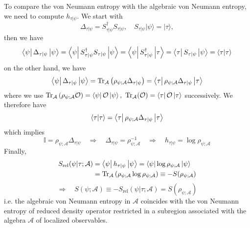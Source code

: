 \documentclass[a4paper,11pt]{article}
\newcommand{\ket}[1]{| #1 \rangle } %
\newcommand{\braket}[2]{\langle  #1 \vphantom{#2} | #2 \vphantom{#1} \rangle } %
\newcommand{\diracprod}[3]{\left\langle  #1 \vphantom{#2#3} \right|#2 \left| #3 \vphantom{#1#2} \right\rangle } %
\renewcommand{\=}[1]{\stackrel{#1}{=}} %
\def\A{\mathcal{A}}
\def\O{\mathcal{O}}
\def\Tr{\text{Tr}}
\def\Srel{S_{\text{rel}}}
\begin{document}
To compare the von Neumann entropy with the algebraic von Neumann entropy, we need to compute $h_{\tau|\psi}$. We start with
\begin{equation}
	\Delta_{\tau|\psi}=S^\dagger_{\tau|\psi}S_{\tau|\psi},\quad S_{\tau|\psi}\ket{\psi}=\ket{\tau},
\end{equation}
then we have
\begin{align}
	\diracprod{\psi}{\Delta_{\tau|\psi}}{\psi}=\diracprod{\psi}{S^\dagger_{\tau|\psi}S_{\tau|\psi}}{\psi}=\diracprod{\psi}{S^\dagger_{\tau|\psi}}{\tau}=\diracprod{\tau}{S_{\tau|\psi}}{\psi}=\braket{\tau}{\tau}
\end{align}
on the other hand, we have
\begin{align}
	\diracprod{\psi}{\Delta_{\tau|\psi}}{\psi}=\Tr_{\A}\left(\rho_{\psi;\A}\Delta_{\tau|\psi}\right)=\diracprod{\tau}{\rho_{\psi;\A}\Delta_{\tau|\psi}}{\tau}
\end{align}
where we use $\Tr_{\A}\left(\rho_{\psi;\A}\O\right)=\diracprod{\psi}{\O}{\psi},~\Tr_{\A}(\O)=\diracprod{\tau}{\O}{\tau}$ successively. We therefore have
\begin{equation}
	\braket{\tau}{\tau}=\diracprod{\tau}{\rho_{\psi;\A}\Delta_{\tau|\psi}}{\tau}
\end{equation}
which implies
\begin{equation}\label{eq:htau}
	\mathbb{I}=\rho_{\psi;\A}\Delta_{\tau|\psi}\quad \Rightarrow\quad \Delta_{\tau|\psi}=\rho_{\psi;\A}^{-1}\quad \Rightarrow\quad h_{\tau|\psi}=\log \rho_{\psi;\A}
\end{equation}
Finally,
\begin{equation}
	\begin{aligned}
		\Srel(\psi|\tau;\A)&=\diracprod{\psi}{h_{\tau|\psi}}{\psi}=\diracprod{\psi}{\log\rho_{\psi;\A}}{\psi}\\
		&=\Tr_{\A}\left(\rho_{\psi;\A}\log\rho_{\psi;\A}\right)\equiv-S(\rho_{\psi;\A})
	\end{aligned}
\end{equation}
\begin{equation}
	\Rightarrow\quad S(\psi;\A)\equiv-\Srel(\psi|\tau;\A)=S(\rho_{\psi;\A})
\end{equation}
i.e. the algebraic von Neumann entropy in $\A$ coincides with the von Neumann entropy of reduced density operator restricted in a subregion associated with the algebra $\A$ of localized observables.
\end{document}
